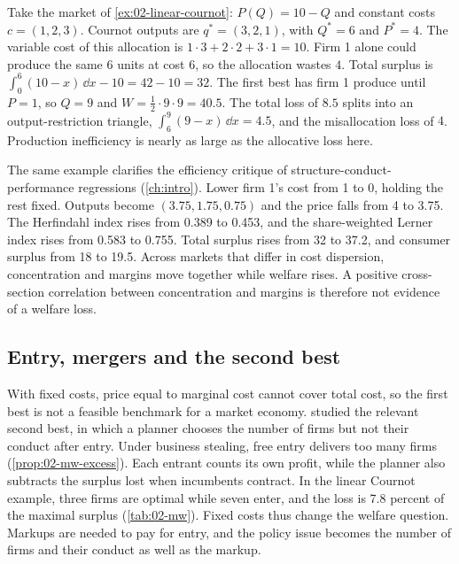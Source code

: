 \begin{remark}\label{rem:02-misallocation}
Take the market of \cref{ex:02-linear-cournot}: $P(Q) = 10 - Q$ and constant costs $c = (1, 2, 3)$. Cournot
outputs are $q^* = (3, 2, 1)$, with $Q^* = 6$ and $P^* = 4$. The variable cost of this allocation is
$1 \cdot 3 + 2 \cdot 2 + 3 \cdot 1 = 10$. Firm 1 alone could produce the same 6 units at cost $6$, so the
allocation wastes $4$. Total surplus is $\int_0^6(10 - x)\,\dd x - 10 = 42 - 10 = 32$. The first best has firm 1
produce until $P = 1$, so $Q = 9$ and $W = \frac{1}{2}\cdot 9 \cdot 9 = 40.5$. The total loss of $8.5$ splits into
an output-restriction triangle, $\int_6^9 (9 - x)\,\dd x = 4.5$, and the misallocation loss of $4$. Production
inefficiency is nearly as large as the allocative loss here.
\end{remark}

The same example clarifies the efficiency critique of structure-conduct-performance regressions
(\cref{ch:intro}). Lower firm 1's cost from 1 to 0, holding the rest fixed. Outputs become $(3.75, 1.75, 0.75)$ and
the price falls from 4 to 3.75. The Herfindahl index rises from 0.389 to 0.453, and the share-weighted Lerner index
rises from 0.583 to 0.755. Total surplus rises from 32 to 37.2, and consumer surplus from 18 to 19.5. Across markets
that differ in cost dispersion, concentration and margins move together while welfare rises. A positive
cross-section correlation between concentration and margins is therefore not evidence of a welfare loss.

\subsection{Entry, mergers and the second best}\label{sec:02-second-best}

With fixed costs, price equal to marginal cost cannot cover total cost, so the first best is not a feasible
benchmark for a market economy.  studied the relevant second best, in which a planner chooses
the number of firms but not their conduct after entry. Under business stealing, free entry delivers too many firms
(\cref{prop:02-mw-excess}). Each entrant counts its own profit, while the planner also subtracts the surplus lost
when incumbents contract. In the linear Cournot example, three firms are optimal while seven enter, and the loss
is 7.8 percent of the maximal surplus (\cref{tab:02-mw}). Fixed costs thus change the welfare question. Markups
are needed to pay for entry, and the policy issue becomes the number of firms and their conduct as well as the
markup.

